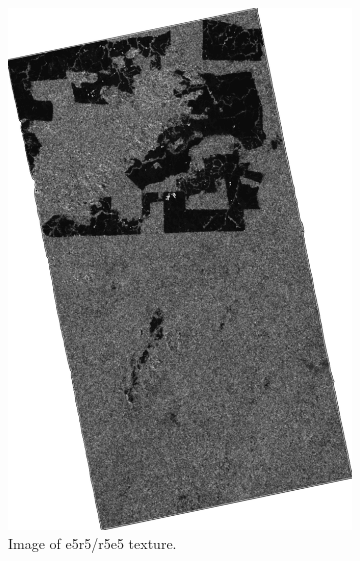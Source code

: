 \begin{figure}[H]
\begin{subfigure}[b]{0.4\linewidth}
    \includegraphics[width=\linewidth]{Chapter4/laws_textures/e5r5_r5e5image.png}
     \caption{Image of e5r5/r5e5 texture.}
  \end{subfigure}
  \centering
  \begin{subfigure}[b]{0.4\linewidth}

\end{subfigure}
\end{figure}
